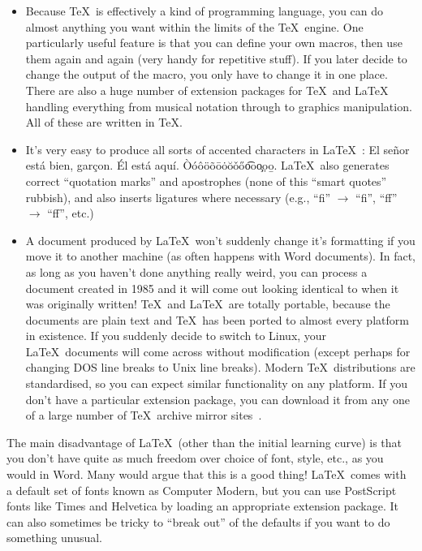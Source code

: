 \documentclass[12pt,a4paper,pdftex]{article}
\begin{document}
\begin{itemize}
	\item Because \TeX\ is effectively a kind of programming language, you can do almost anything you want within the limits of the \TeX\ engine. One particularly useful feature is that you can define your own macros, then use them again and again (very handy for repetitive stuff). If you later decide to change the output of the macro, you only have to change it in one place. There are also a huge number of extension packages for \TeX\ and \LaTeX\, handling everything from musical notation through to graphics manipulation. All of these are written in \TeX.
	
	\item It's very easy to produce all sorts of accented characters in \LaTeX~\cite{UsersGuide}: El se\~{n}or est\'{a} bien, gar\c{c}on. \'{E}l est\'{a} aqu\'{i}. \`{O}\'{o}\^{o}\"{o}\~{o}\={o}\.{o}\u{o}\v{o}\H{o}\t{oo}\c{o}\d{o}\b{o}. \LaTeX\ also generates correct ``quotation marks'' and apostrophes (none of this ``smart quotes'' rubbish), and also inserts ligatures where necessary (e.g., ``f{}i'' \(\rightarrow\) ``fi'', ``f{}f'' \(\rightarrow\) ``ff'', etc.)
	
	\item A document produced by \LaTeX\ won't suddenly change it's formatting if you move it to another machine (as often happens with Word documents). In fact, as long as you haven't done anything really weird, you can process a document created in 1985 and it will come out looking identical to when it was originally written! \TeX\ and \LaTeX\ are totally portable, because the documents are plain text and \TeX\ has been ported to almost every platform in existence. If you suddenly decide to switch to Linux, your \LaTeX\ documents will come across without modification (except perhaps for changing DOS line breaks to Unix line breaks). Modern \TeX\ distributions are standardised, so you can expect similar functionality on any platform. If you don't have a particular extension package, you can download it from any one of a large number of \TeX\ archive mirror sites~\cite{CTAN}.

\end{itemize}

The main disadvantage of \LaTeX\ (other than the initial learning curve) is that you don't have quite as much freedom over choice of font, style, etc., as you would in Word. Many would argue that this is a good thing! \LaTeX\ comes with a default set of fonts known as Computer Modern, but you can use PostScript fonts like {\selectfont Times} and {\selectfont Helvetica} by loading an appropriate extension package. It can also sometimes be tricky to ``break out'' of the defaults if you want to do something unusual.
\end{document}
